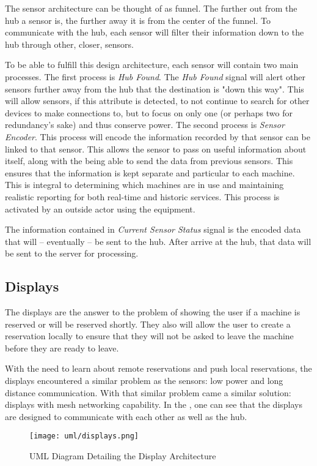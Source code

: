 \documentclass[PPFS.tex]{template/subfiles}
\newcommand{\sn}[1]{\textit{#1}}
\begin{document}
The sensor architecture can be thought of as funnel. The further out from the hub a sensor is, the further away it is from the center of the funnel. To communicate with the hub, each sensor will filter their information down to the hub through other, closer, sensors.

To be able to fulfill this design architecture, each sensor will contain two main processes. The first process is \sn{Hub Found}. The \sn{Hub Found} signal will alert other sensors further away from the hub that the destination is "down this way". This will allow sensors, if this attribute is detected, to not continue to search for other devices to make connections to, but to focus on only one (or perhaps two for redundancy's sake) and thus conserve power. The second process is \sn{Sensor Encoder}. This process will encode the information recorded by that sensor can be linked to that sensor. This allows the sensor to pass on useful information about itself,  along with the being able to send the data from previous sensors. This ensures that the information is kept separate and particular to each machine. This is integral to determining which machines are in use and maintaining realistic reporting for both real-time and historic services. This process is activated by an outside actor using the equipment.

The information contained in \sn{Current Sensor Status} signal is the encoded data that will -- eventually -- be sent to the hub. After arrive at the hub, that data will be sent to the server for processing.

\subsection{Displays}

The displays are the answer to the problem of showing the user if a machine is reserved or will be reserved shortly. They also will allow the user to create a reservation locally to ensure that they will not be asked to leave the machine before they are ready to leave.

With the need to learn about remote reservations and push local reservations, the displays encountered a similar problem as the sensors: low power and long distance communication. With that similar problem came a similar solution: displays with mesh networking capability. In the , one can see that the displays are designed to communicate with each other as well as the hub.

\begin{figure}[H]
    \centering
    \texttt{[image: uml/displays.png]}
    \caption{UML Diagram Detailing the Display Architecture}
    \label{fig:display_arch}
\end{figure}
\end{document}
